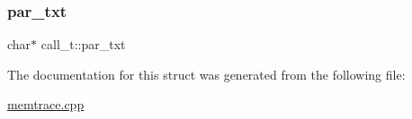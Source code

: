 \mbox{\label{structcall__t_a24e185188a17e272396e118640672aba}} 
\subsubsection{\texorpdfstring{par\+\_\+txt}{par\_txt}}
{\footnotesize\ttfamily char$\ast$ call\+\_\+t\+::par\+\_\+txt}



The documentation for this struct was generated from the following file\+:\begin{DoxyCompactItemize}
\item 
\hyperlink{memtrace_8cpp}{memtrace.\+cpp}\end{DoxyCompactItemize}
